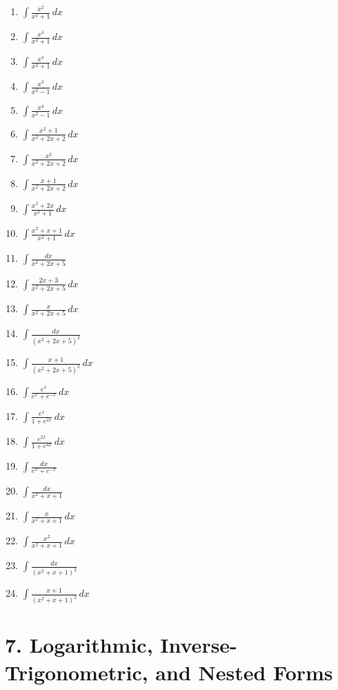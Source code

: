 \documentclass[11pt]{article}
\begin{document}
\begin{enumerate}
\item $\displaystyle \int \frac{x^2}{x^2+1}\,dx$
\item $\displaystyle \int \frac{x^3}{x^2+1}\,dx$
\item $\displaystyle \int \frac{x^4}{x^2+1}\,dx$
\item $\displaystyle \int \frac{x^3}{x^2-1}\,dx$
\item $\displaystyle \int \frac{x^4}{x^2-1}\,dx$
\item $\displaystyle \int \frac{x^2+1}{x^2+2x+2}\,dx$
\item $\displaystyle \int \frac{x^2}{x^2+2x+2}\,dx$
\item $\displaystyle \int \frac{x+1}{x^2+2x+2}\,dx$
\item $\displaystyle \int \frac{x^3+2x}{x^2+1}\,dx$
\item $\displaystyle \int \frac{x^2+x+1}{x^2+1}\,dx$
\item $\displaystyle \int \frac{dx}{x^2+2x+5}$
\item $\displaystyle \int \frac{2x+3}{x^2+2x+5}\,dx$
\item $\displaystyle \int \frac{x}{x^2+2x+5}\,dx$
\item $\displaystyle \int \frac{dx}{(x^2+2x+5)^2}$
\item $\displaystyle \int \frac{x+1}{(x^2+2x+5)^2}\,dx$
\item $\displaystyle \int \frac{e^x}{e^x+e^{-x}}\,dx$
\item $\displaystyle \int \frac{e^x}{1+e^{2x}}\,dx$
\item $\displaystyle \int \frac{e^{2x}}{1+e^{4x}}\,dx$
\item $\displaystyle \int \frac{dx}{e^x+e^{-x}}$
\item $\displaystyle \int \frac{dx}{x^2+x+1}$
\item $\displaystyle \int \frac{x}{x^2+x+1}\,dx$
\item $\displaystyle \int \frac{x^2}{x^2+x+1}\,dx$
\item $\displaystyle \int \frac{dx}{(x^2+x+1)^2}$
\item $\displaystyle \int \frac{x+1}{(x^2+x+1)^2}\,dx$
\end{enumerate}

\section*{7. Logarithmic, Inverse-Trigonometric, and Nested Forms}
\end{document}
